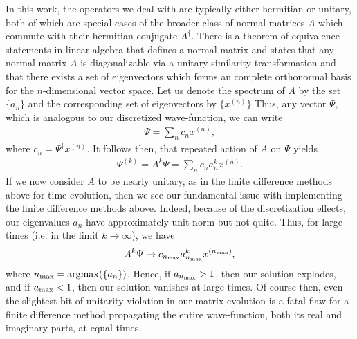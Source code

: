 In this work, the operators we deal with are typically either hermitian or unitary, both of which are special cases of the broader class of normal matrices $A$ which commute with their hermitian conjugate $A^{\dagger}$.
There is a theorem of equivalence statements in linear algebra that defines a normal matrix and states that any normal matrix $A$ is diagonalizable via a unitary similarity transformation and that there exists a set of eigenvectors which forms an complete orthonormal basis for the $n$-dimensional vector space.
Let us denote the spectrum of $A$ by the set $\{ a_{n} \}$ and the corresponding set of eigenvectors by $\{ x^{(n)} \}$
Thus, any vector $\Psi$, which is analogous to our discretized wave-function, we can write
\begin{align}
    \Psi = \sum_{n} c_{n} x^{(n)}
,\end{align}
where $c_{n} = \Psi^{\dagger} x^{(n)}$.
It follows then, that repeated action of $A$ on $\Psi$ yields
\begin{align}
    \Psi^{(k)} = A^{k} \Psi = \sum_{n} c_{n} a_{n}^{k} x^{(n)}
.\end{align}
If we now consider $A$ to be nearly unitary, as in the finite difference methods above for time-evolution, then we see our fundamental issue with implementing the finite difference methods above.
Indeed, because of the discretization effects, our eigenvalues $a_{n}$ have approximately unit norm but not quite.
Thus, for large times (i.e. in the limit $k \rightarrow \infty$), we have
\begin{align}
    A^{k} \Psi \rightarrow c_{n_{\rm max}} a_{n_{\rm max}}^{k} x^{(n_{\rm max})}
,\end{align}
where $n_{\rm max} = {\rm argmax}(\{ a_{n} \})$.
Hence, if $a_{n_{\rm max}} > 1$, then our solution explodes, and if $a_{\rm max} < 1$, then our solution vanishes at large times.
Of course then, even the slightest bit of unitarity violation in our matrix evolution is a fatal flaw for a finite difference method propagating the entire wave-function, both its real and imaginary parts, at equal times.

    

